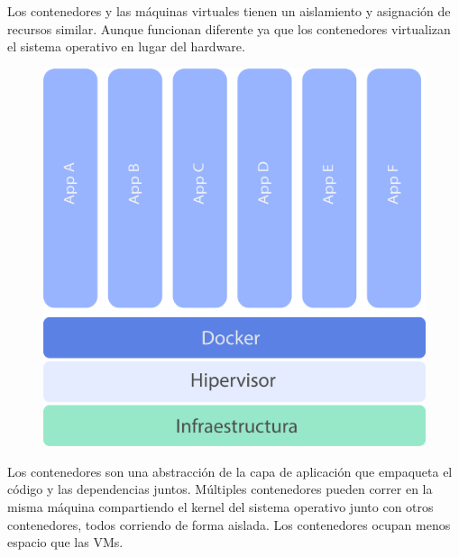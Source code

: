 Los contenedores y las máquinas virtuales tienen un aislamiento y asignación de recursos similar. Aunque funcionan diferente ya que los contenedores virtualizan el sistema operativo en lugar del hardware.

\begin{figure}[h!]
  \centering
    \includegraphics[scale=0.7]{images/containers.png}
  \label{fig:contvm}
\end{figure}

\break

Los contenedores son una abstracción de la capa de aplicación que empaqueta el código y las dependencias juntos. Múltiples contenedores pueden correr en la misma máquina compartiendo el kernel del sistema operativo junto con otros contenedores, todos corriendo de forma aislada. Los contenedores ocupan menos espacio que las VMs.

